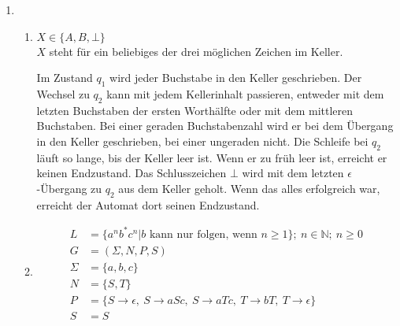 \documentclass[a4paper]{scrartcl}
\title{\titleinfo}
\author{Arne Feil}
\date{\today}
\newcommand{\aufgabe}[1]{\item[\textbf{#1}]}
\begin{document}
\begin{enumerate}

\aufgabe{4.3}
\begin{enumerate}[1.]
 \item
 $X \in \{A,B,\bot\}$\\
 $X$ steht für ein beliebiges der drei möglichen Zeichen im Keller.\\

Im Zustand $q_1$ wird jeder Buchstabe in den Keller geschrieben.
Der Wechsel zu $q_2$ kann mit jedem Kellerinhalt passieren, entweder mit dem letzten Buchstaben der ersten Worthälfte oder mit dem mittleren Buchstaben.
Bei einer geraden Buchstabenzahl wird er bei dem Übergang in den Keller geschrieben, bei einer ungeraden nicht.
Die Schleife bei $q_2$ läuft so lange, bis der Keller leer ist. Wenn er zu früh leer ist, erreicht er keinen Endzustand.
Das Schlusszeichen $\bot$ wird mit dem letzten $\epsilon$-Übergang zu $q_2$ aus dem Keller geholt. Wenn das alles erfolgreich war, erreicht der Automat dort seinen Endzustand.

\item
\begin{align*}
 L &= \{a^n b^* c^n | b\text{ kann nur folgen, wenn } n\geq 1\};\ n\in\mathbb{N};\ n\geq 0\\
 G &= (\Sigma,N,P,S)\\
 \Sigma &= \{a,b,c\}\\ %
 N &= \{S,T\}\\
 P &= \{
   S\to \epsilon,\
   S\to aSc,\
   S\to aTc,\
   T\to bT,\
   T\to \epsilon
 \}\\
 S &= S
\end{align*}


\end{enumerate}
\end{enumerate}
\end{document}
